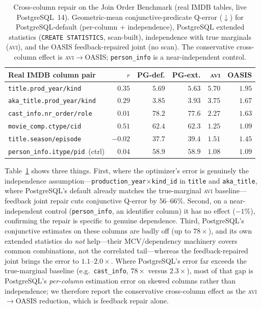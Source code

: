 \documentclass[preprint,12pt]{elsarticle}
\begin{document}
\begin{table}[t]
  \centering\small
  \caption{Cross-column repair on the Join Order Benchmark (real IMDB tables, live
  PostgreSQL~14). Geometric-mean conjunctive-predicate Q-error ($\downarrow$) for
  PostgreSQL-default (per-column $+$ independence), PostgreSQL extended statistics
  (\texttt{CREATE STATISTICS}, scan-built), independence with true marginals (\textsc{avi}),
  and the OASIS feedback-repaired joint (no scan). The conservative cross-column effect is
  \textsc{avi}$\to$OASIS; \texttt{person\_info} is a near-independent control.}
  \label{tab:crosscol_job}
  \setlength{\tabcolsep}{5pt}
  \begin{tabular}{l r r r r r}
    \toprule
    Real IMDB column pair & $r$ & PG-def. & PG-ext. & \textsc{avi} & OASIS \\
    \midrule
    \texttt{title.prod\_year/kind}        & $0.35$  & $5.69$ & $5.63$ & $5.70$ & $\mathbf{1.95}$ \\
    \texttt{aka\_title.prod\_year/kind}   & $0.29$  & $3.85$ & $3.93$ & $3.75$ & $\mathbf{1.67}$ \\
    \texttt{cast\_info.nr\_order/role}    & $0.01$  & $78.2$ & $77.6$ & $2.27$ & $\mathbf{1.63}$ \\
    \texttt{movie\_comp.ctype/cid}        & $0.51$  & $62.4$ & $62.3$ & $1.25$ & $\mathbf{1.09}$ \\
    \texttt{title.season/episode}         & $-0.02$ & $37.7$ & $39.4$ & $1.51$ & $\mathbf{1.45}$ \\
    \texttt{person\_info.itype/pid}~(ctrl)& $0.04$  & $58.9$ & $58.9$ & $1.08$ & $1.09$ \\
    \bottomrule
  \end{tabular}
\end{table}

Table~\ref{tab:crosscol_job} shows three things. First, where the optimizer's error is
genuinely the independence assumption---\texttt{production\_year}$\times$\texttt{kind\_id} in
\texttt{title} and \texttt{aka\_title}, where PostgreSQL's default already matches the
true-marginal \textsc{avi} baseline---feedback joint repair cuts conjunctive Q-error by
$56$--$66\%$. Second, on a near-independent control (\texttt{person\_info}, an identifier
column) it has no effect ($-1\%$), confirming the repair is specific to genuine dependence.
Third, PostgreSQL's conjunctive estimates on these columns are badly off (up to $78\times$),
and its own extended statistics do \emph{not} help---their MCV/dependency machinery covers
common combinations, not the correlated tail---whereas the feedback-repaired joint brings the
error to $1.1$--$2.0\times$. Where PostgreSQL's error far exceeds the true-marginal baseline
(e.g.\ \texttt{cast\_info}, $78\times$ versus $2.3\times$), most of that gap is PostgreSQL's
\emph{per-column} estimation error on skewed columns rather than independence; we therefore
report the conservative cross-column effect as the \textsc{avi}$\to$OASIS reduction, which is
feedback repair alone.
\end{document}
